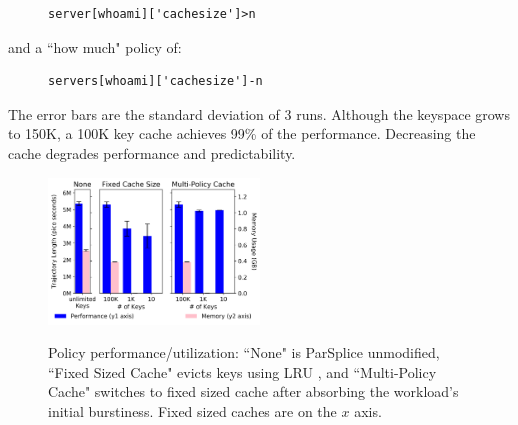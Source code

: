 \begin{figure}[h]
\footnotesize
\begin{verbatim}
server[whoami]['cachesize']>n
\end{verbatim}
\end{figure}

and a ``how much" policy of:

\begin{figure}[h]
\footnotesize
\begin{verbatim}
servers[whoami]['cachesize']-n
\end{verbatim}
\end{figure}

The error bars are the standard deviation of 3 runs.  Although the keyspace
grows to 150K, a 100K key cache achieves 99\% of the performance. Decreasing
the cache degrades performance and predictability.




\begin{figure}[t]
\noindent\includegraphics[width=0.5\textwidth]{figures/methodology-tradeoff.png}\\
\caption{Policy performance/utilization: ``None" is ParSplice unmodified,
``Fixed Sized Cache" evicts keys using LRU , and ``Multi-Policy Cache" switches
to fixed sized cache after absorbing the workload's initial burstiness.  Fixed
sized caches are on the \(x\) axis.\label{fig:methodology-tradeoff}}
\end{figure}

